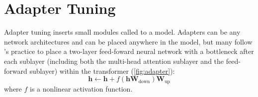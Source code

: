 \section{Adapter Tuning}
Adapter tuning \citep{NIPS2017_e7b24b11} inserts small modules called   to a model. Adapters can be any network architectures and can be placed anywhere in the model, but many follow \citet{pmlr-v97-houlsby19a}'s practice to place a two-layer feed-foward neural network with a bottleneck after each sublayer (including both the multi-head attention sublayer and the feed-forward sublayer) within the transformer (\cref{fig:adapter}):  
\begin{equation}
    \textbf{h}\leftarrow \textbf{h}+f(\textbf{h}\textbf{W}_{\text{down}})\textbf{W}_{\text{up}}
\end{equation}
where $f$ is a nonlinear activation function.


